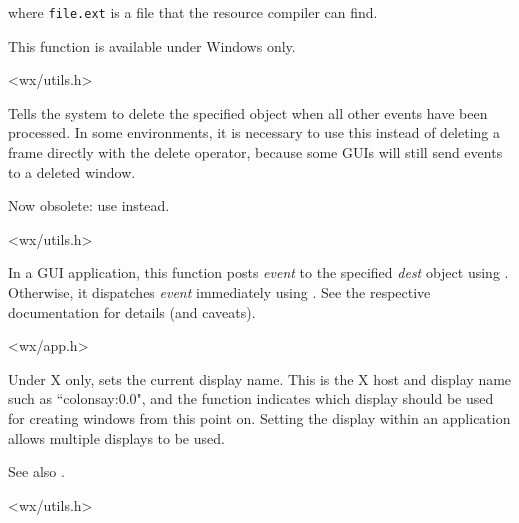 where {\tt file.ext} is a file that the resource compiler can find.

This function is available under Windows only.


<wx/utils.h>


\label{wxpostdelete}


Tells the system to delete the specified object when
all other events have been processed. In some environments, it is
necessary to use this instead of deleting a frame directly with the
delete operator, because some GUIs will still send events to a deleted window.

Now obsolete: use  instead.


<wx/utils.h>


\label{wxpostevent}


In a GUI application, this function posts {\it event} to the specified {\it dest}
object using .
Otherwise, it dispatches {\it event} immediately using
.
See the respective documentation for details (and caveats).


<wx/app.h>


\label{wxsetdisplayname}


Under X only, sets the current display name. This is the X host and display name such
as ``colonsay:0.0", and the function indicates which display should be used for creating
windows from this point on. Setting the display within an application allows multiple
displays to be used.

See also .


<wx/utils.h>


\label{wxstripmenucodes}

